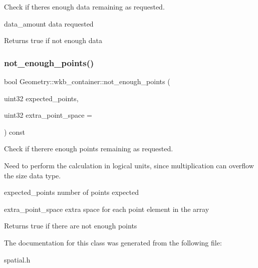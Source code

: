 Check if there\textquotesingle{}s enough data remaining as requested.

\begin{DoxyItemize}
\item data\+\_\+amount data requested\end{DoxyItemize}
\begin{DoxyReturn}{Returns}
true if not enough data 
\end{DoxyReturn}
\mbox{\label{classGeometry_1_1wkb__container_adc7224d1d02516ae57eb5fee366e6a5f}} 
\subsubsection{\texorpdfstring{not\+\_\+enough\+\_\+points()}{not\_enough\_points()}}
{\footnotesize\ttfamily bool Geometry\+::wkb\+\_\+container\+::not\+\_\+enough\+\_\+points (\begin{DoxyParamCaption}\item[{uint32}]{expected\+\_\+points,  }\item[{uint32}]{extra\+\_\+point\+\_\+space = {} }\end{DoxyParamCaption}) const\hspace{0.3cm}{\ttfamily [inline]}}

Check if there\textquotesingle{}re enough points remaining as requested.

Need to perform the calculation in logical units, since multiplication can overflow the size data type.

\begin{DoxyItemize}
\item expected\+\_\+points number of points expected \item extra\+\_\+point\+\_\+space extra space for each point element in the array\end{DoxyItemize}
\begin{DoxyReturn}{Returns}
true if there are not enough points 
\end{DoxyReturn}


The documentation for this class was generated from the following file\+:\begin{DoxyCompactItemize}
\item 
spatial.\+h\end{DoxyCompactItemize}

